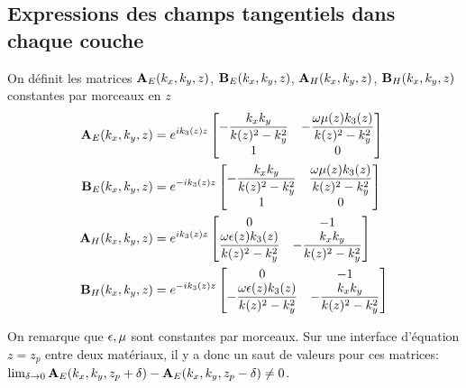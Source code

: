     \subsection{Expressions des champs tangentiels dans chaque couche}

      \begin{defn}
        On définit les matrices \(\mathbf{A}_{E}(k_x,k_y,z)\), \(\mathbf{B}_{E}(k_x,k_y,z)\), \(\mathbf{A}_{H}(k_x,k_y,z)\), \(\mathbf{B}_{H}(k_x,k_y,z)\) constantes par morceaux en \(z\)
        \begin{align*}
          \mathbf{A}_{E}(k_x,k_y,z) &= e^{ik_3(z)z}
          \begin{bmatrix}
            -\dfrac{k_xk_y}{k(z)^2 - k_y^2} & -\dfrac{\omega\mu(z)k_3(z)}{k(z)^2 - k_y^2}
            \\
            1 & 0
          \end{bmatrix}
          \\
          \mathbf{B}_{E}(k_x,k_y,z) &= e^{-ik_3(z)z}
          \begin{bmatrix}
            -\dfrac{k_xk_y}{k(z)^2 - k_y^2} & \dfrac{\omega\mu(z) k_3(z)}{k(z)^2 - k_y^2}
            \\
            1 & 0
          \end{bmatrix}
          \\
          \mathbf{A}_{H}(k_x,k_y,z) &= e^{ik_3(z)z}
          \begin{bmatrix}
            0 & -1
            \\
            \dfrac{\omega\epsilon(z)k_3(z)}{k(z)^2 - k_y^2} & -\dfrac{k_xk_y}{k(z)^2 - k_y^2}
          \end{bmatrix}
          \\
          \mathbf{B}_{H}(k_x,k_y,z) &= e^{-ik_3(z)z}
          \begin{bmatrix}
            0 & -1
            \\
            -\dfrac{\omega\epsilon(z)k_3(z)}{k(z)^2 - k_y^2} & -\dfrac{k_xk_y}{k(z)^2 - k_y^2}
          \end{bmatrix}
        \end{align*}
      \end{defn}

        On remarque que \(\epsilon,\mu\) sont constantes par morceaux.
        Sur une interface d'équation \(z=z_p\) entre deux matériaux, il y a donc un saut de valeurs pour ces matrices: \(\lim_{\delta\rightarrow 0 } \mathbf{A}_E(k_x,k_y,z_p+ \delta) - \mathbf{A}_E(k_x,k_y,z_p - \delta) \not = 0\).

